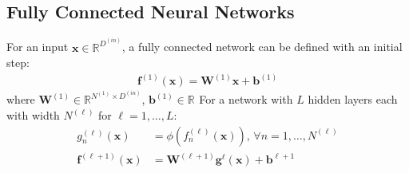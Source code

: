 \documentclass[twoside,11pt]{article}
\begin{document}
\subsection{Fully Connected Neural Networks}
For an input $\mathbf{x} \in \mathbb{R}^{D^{(in)}}$, a fully connected network can be defined with an initial step:
\begin{align}
    \label{nn-initial-step}
    \mathbf{f}^{(1)}(\mathbf{x}) = \mathbf{W}^{(1)} \mathbf{x} + \mathbf{b}^{(1)}
\end{align}
where $\mathbf{W}^{(1)} \in \mathbb{R}^{N^{(1)} \times D^{(in)}}$,  $\mathbf{b}^{(1)} \in \mathbb{R}^{}$
For a network with $L$ hidden layers each with width $N^{(\ell)}$ for $\ell = 1, \dots, L$:
\begin{align}
    \label{nn-recursion-non-linearity}
    g_n^{(\ell)}(\mathbf{x}) &= \phi \left( f_n^{(\ell)}(\mathbf{x})\right) \text{, } \forall n=1,\dots,N^{(\ell)}\\
    \label{nn-recursion-affine-transformation}
    \mathbf{f}^{(\ell+1)}(\mathbf{x}) &= \mathbf{W}^{(\ell+1)}\mathbf{g}^{\ell}(\mathbf{x}) + \mathbf{b}^{\ell+1}
\end{align}
\end{document}
